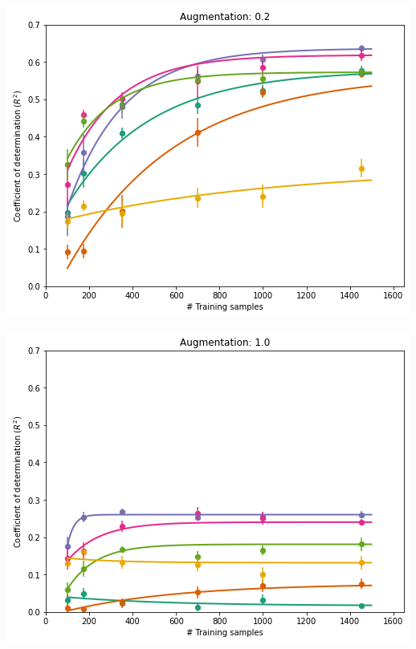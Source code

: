 \documentclass[a0paper,landscape,fontscale=0.365]{baposter}
\newenvironment{Figure}
  {\par\medskip\noindent\minipage{\linewidth}}
  {\endminipage\par\medskip}
\begin{document}
\begin{poster}
{\begin{multicols}{4}
    \columnbreak
    \begin{Figure}
        \centering
        \includegraphics[width=1.0\linewidth]{figures/curves_aug_5}
    \end{Figure}

    \columnbreak
    \begin{Figure}
        \centering
        \includegraphics[width=1.0\linewidth]{figures/curves_aug_1}
    \end{Figure}


\end{multicols}}
\end{poster}
\end{document}
